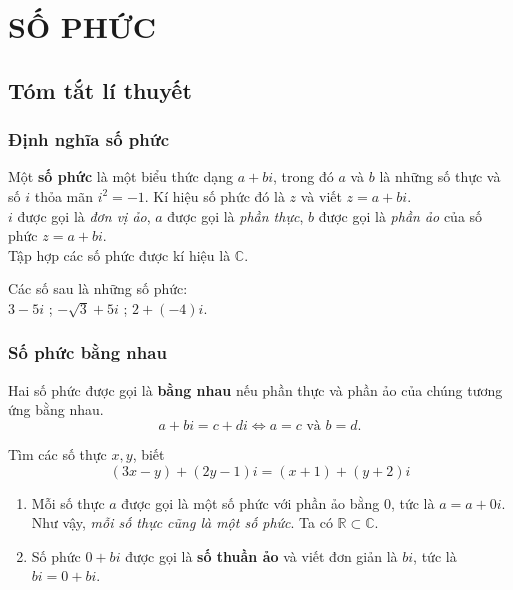 \section{SỐ PHỨC}
	\subsection{Tóm tắt lí thuyết}
	\subsubsection{Định nghĩa số phức}
	\begin{dn}
		Một \textbf{số phức} là một biểu thức dạng $ a+bi $, trong đó $ a $ và $ b $ là những số thực và số $ i $ thỏa mãn $\boxed{ i^2=-1} $. Kí hiệu số phức đó là $ z $ và viết $ z=a+bi $.\\
		$ i $ được gọi là \textit{đơn vị ảo}, $ a $ được gọi là \textit{phần thực}, $ b $ được gọi là \textit{phần ảo} của số phức $ z=a+bi $.\\
		Tập hợp các số phức được kí hiệu là $ \mathbb C $.
	\end{dn}
	\begin{vd}
		Các số sau là những số phức:\\
		$3-5i$ ; $ -\sqrt 3+5i$ ; $ 2+\left(-4\right)i$.
	\end{vd}
	\subsubsection{Số phức bằng nhau}
	\begin{dn}
		Hai số phức được gọi là \textbf{bằng nhau} nếu phần thực và phần ảo của chúng tương ứng bằng nhau. 
		$$\boxed{a+bi=c+di \Leftrightarrow a=c \text{ và }b=d.}$$
	\end{dn}
	\begin{vd}
		Tìm các số thực $ x,y $, biết $$\left(3x-y\right)+\left(2y-1\right)i=\left(x+1\right)+\left(y+2\right)i$$
	\end{vd}
	\begin{note}
		\begin{enumerate}
			\item Mỗi số thực $ a $ được gọi là một số phức với phần ảo bằng $ 0 $, tức là $ a=a+0i $.\\
			Như vậy, \textit{mỗi số thực cũng là một số phức}. Ta có $ \mathbb R \subset \mathbb C $.
			\item Số phức $ 0+bi $ được gọi là \textbf{số thuần ảo} và viết đơn giản là $ bi $, tức là $ bi=0+bi $.
		\end{enumerate}
	\end{note}
